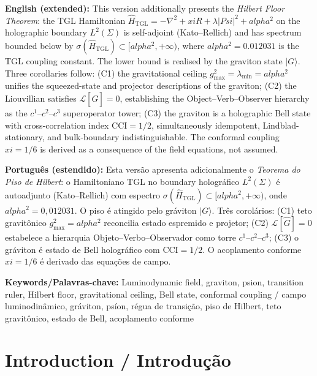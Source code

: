 \documentclass[12pt,a4paper]{article}
\def\Psi{Psi}%
\def\alpha{alpha}%
\def\xi{xi}%
\begin{document}
\vspace{0.5cm}

\textbf{English (extended):} This version additionally presents the \emph{Hilbert Floor Theorem}: the TGL Hamiltonian $\hat{H}_{\text{TGL}} = -\nabla^2 + \xi R + \lambda|\Psi|^2 + \alpha^2$ on the holographic boundary $L^2(\Sigma)$ is self-adjoint (Kato--Rellich) and has spectrum bounded below by $\sigma(\hat{H}_{\text{TGL}}) \subset [\alpha^2, +\infty)$, where $\alpha^2 = 0.012031$ is the TGL coupling constant. The lower bound is realised by the graviton state $|G\rangle$. Three corollaries follow: (C1) the gravitational ceiling $g_{\max}^2 = \lambda_{\min} = \alpha^2$ unifies the squeezed-state and projector descriptions of the graviton; (C2) the Liouvillian satisfies $\mathcal{L}[\hat{G}] = 0$, establishing the Object--Verb--Observer hierarchy as the $c^1$--$c^2$--$c^3$ superoperator tower; (C3) the graviton is a holographic Bell state with cross-correlation index $\mathrm{CCI} = 1/2$, simultaneously idempotent, Lindblad-stationary, and bulk-boundary indistinguishable. The conformal coupling $\xi = 1/6$ is derived as a consequence of the field equations, not assumed.

\vspace{0.3cm}

\textbf{Português (estendido):} Esta versão apresenta adicionalmente o \emph{Teorema do Piso de Hilbert}: o Hamiltoniano TGL no boundary holográfico $L^2(\Sigma)$ é autoadjunto (Kato--Rellich) com espectro $\sigma(\hat{H}_{\text{TGL}}) \subset [\alpha^2, +\infty)$, onde $\alpha^2 = 0{,}012031$. O piso é atingido pelo gráviton $|G\rangle$. Três corolários: (C1) teto gravitônico $g_{\max}^2 = \alpha^2$ reconcilia estado espremido e projetor; (C2) $\mathcal{L}[\hat{G}] = 0$ estabelece a hierarquia Objeto--Verbo--Observador como torre $c^1$--$c^2$--$c^3$; (C3) o gráviton é estado de Bell holográfico com $\mathrm{CCI} = 1/2$. O acoplamento conforme $\xi = 1/6$ é derivado das equações de campo.

\textbf{Keywords/Palavras-chave:} Luminodynamic field, graviton, psion, transition ruler, Hilbert floor, gravitational ceiling, Bell state, conformal coupling / campo luminodinâmico, gráviton, psíon, régua de transição, piso de Hilbert, teto gravitônico, estado de Bell, acoplamento conforme

\newpage

\tableofcontents

\newpage

\section{Introduction / Introdução}
\end{document}
